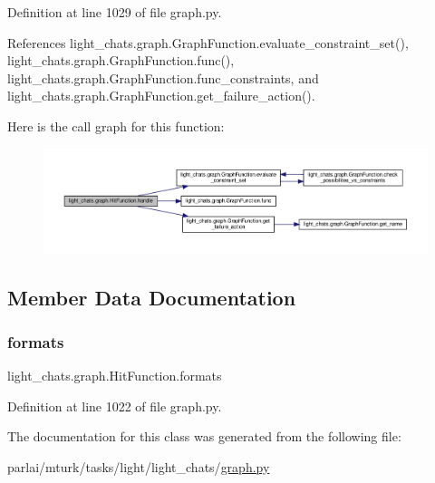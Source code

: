 Definition at line 1029 of file graph.\+py.



References light\+\_\+chats.\+graph.\+Graph\+Function.\+evaluate\+\_\+constraint\+\_\+set(), light\+\_\+chats.\+graph.\+Graph\+Function.\+func(), light\+\_\+chats.\+graph.\+Graph\+Function.\+func\+\_\+constraints, and light\+\_\+chats.\+graph.\+Graph\+Function.\+get\+\_\+failure\+\_\+action().

Here is the call graph for this function\+:
\nopagebreak
\begin{figure}[H]
\begin{center}
\leavevmode
\includegraphics[width=350pt]{classlight__chats_1_1graph_1_1HitFunction_afcc616271cdc3acede3dcabdfe516598_cgraph}
\end{center}
\end{figure}


\subsection{Member Data Documentation}
\mbox{\label{classlight__chats_1_1graph_1_1HitFunction_a52f8cfade8a8bd90e48e125bc2232e44}} 
\subsubsection{\texorpdfstring{formats}{formats}}
{\footnotesize\ttfamily light\+\_\+chats.\+graph.\+Hit\+Function.\+formats}



Definition at line 1022 of file graph.\+py.



The documentation for this class was generated from the following file\+:\begin{DoxyCompactItemize}
\item 
parlai/mturk/tasks/light/light\+\_\+chats/\hyperlink{parlai_2mturk_2tasks_2light_2light__chats_2graph_8py}{graph.\+py}\end{DoxyCompactItemize}
